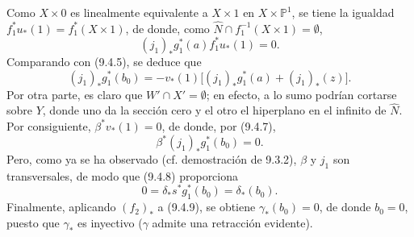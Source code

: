 Como $X\times0$ es linealmente equivalente a $X\times1$ en $X\times\mathbb P^1$, se tiene la igualdad $f_1^*u_*(1)=f_1^*(X\times1)$, de donde, como $\widehat N\cap f_1^{-1}(X\times1)=\emptyset$,
\[
(j_1)_*g_1^*(a)f_1^*u_*(1)=0.
\tag{9.4.6}
\]
Comparando con (9.4.5), se deduce que
\[
(j_1)_*g_1^*(b_0)=-v_*(1)\bigl[(j_1)_*g_1^*(a)+(j_1)_*(z)\bigr].
\tag{9.4.7}
\]
Por otra parte, es claro que $W'\cap X'=\emptyset$; en efecto, a lo sumo podrían cortarse sobre $Y$, donde uno da la sección cero y el otro el hiperplano en el infinito de $\widehat N$. Por consiguiente, $\beta^*v_*(1)=0$, de donde, por (9.4.7),
\[
\beta^*(j_1)_*g_1^*(b_0)=0.
\tag{9.4.8}
\]
Pero, como ya se ha observado (cf. demostración de 9.3.2), $\beta$ y $j_1$ son transversales, de modo que (9.4.8) proporciona
\[
0=\delta_*s^*g_1^*(b_0)=\delta_*(b_0).
\tag{9.4.9}
\]
Finalmente, aplicando $(f_2)_*$ a (9.4.9), se obtiene $\gamma_*(b_0)=0$, de donde $b_0=0$, puesto que $\gamma_*$ es inyectivo ($\gamma$ admite una retracción evidente).

